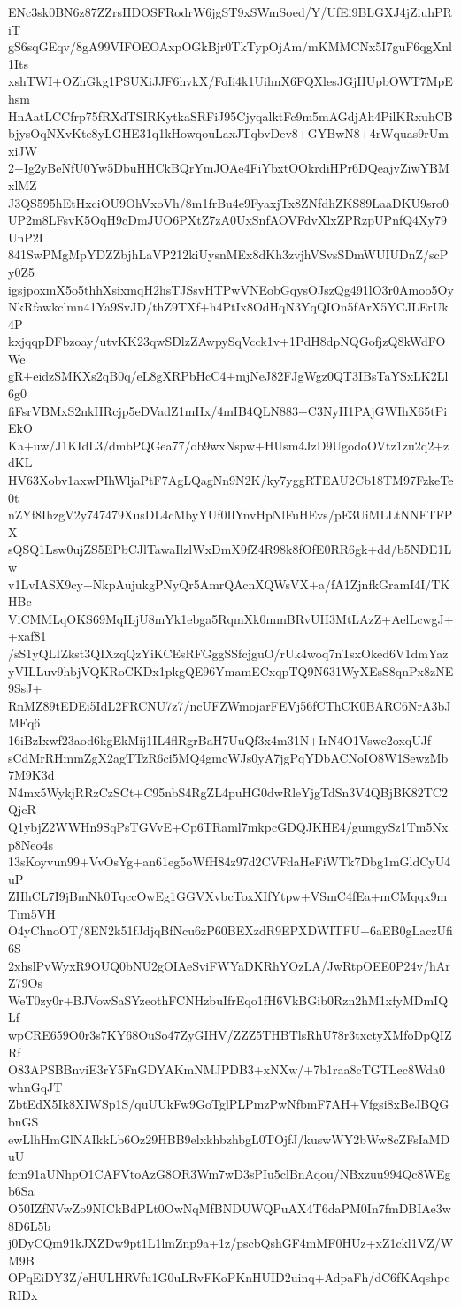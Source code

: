 ENc3sk0BN6z87ZZrsHDOSFRodrW6jgST9xSWmSoed/Y/UfEi9BLGXJ4jZiuhPRiT
gS6sqGEqv/8gA99VIFOEOAxpOGkBjr0TkTypOjAm/mKMMCNx5I7guF6qgXnl1Its
xshTWI+OZhGkg1PSUXiJJF6hvkX/FoIi4k1UihnX6FQXlesJGjHUpbOWT7MpEhsm
HnAatLCCfrp75fRXdTSIRKytkaSRFiJ95CjyqalktFc9m5mAGdjAh4PilKRxuhCB
bjysOqNXvKte8yLGHE31q1kHowqouLaxJTqbvDev8+GYBwN8+4rWquas9rUmxiJW
2+Ig2yBeNfU0Yw5DbuHHCkBQrYmJOAe4FiYbxtOOkrdiHPr6DQeajvZiwYBMxlMZ
J3QS595hEtHxciOU9OhVxoVh/8m1frBu4e9FyaxjTx8ZNfdhZKS89LaaDKU9sro0
UP2m8LFsvK5OqH9cDmJUO6PXtZ7zA0UxSnfAOVFdvXlxZPRzpUPnfQ4Xy79UnP2I
841SwPMgMpYDZZbjhLaVP212kiUysnMEx8dKh3zvjhVSvsSDmWUIUDnZ/scPy0Z5
igsjpoxmX5o5thhXsixmqH2hsTJSsvHTPwVNEobGqysOJszQg491lO3r0Amoo5Oy
NkRfawkclmn41Ya9SvJD/thZ9TXf+h4PtIx8OdHqN3YqQIOn5fArX5YCJLErUk4P
kxjqqpDFbzoay/utvKK23qwSDlzZAwpySqVcck1v+1PdH8dpNQGofjzQ8kWdFOWe
gR+eidzSMKXs2qB0q/eL8gXRPbHcC4+mjNeJ82FJgWgz0QT3IBsTaYSxLK2Ll6g0
fiFsrVBMxS2nkHRcjp5eDVadZ1mHx/4mIB4QLN883+C3NyH1PAjGWIhX65tPiEkO
Ka+uw/J1KIdL3/dmbPQGea77/ob9wxNspw+HUsm4JzD9UgodoOVtz1zu2q2+zdKL
HV63Xobv1axwPIhWljaPtF7AgLQagNn9N2K/ky7yggRTEAU2Cb18TM97FzkeTe0t
nZYf8IhzgV2y747479XusDL4cMbyYUf0IlYnvHpNlFuHEvs/pE3UiMLLtNNFTFPX
sQSQ1Lsw0ujZS5EPbCJlTawaIlzlWxDmX9fZ4R98k8fOfE0RR6gk+dd/b5NDE1Lw
v1LvIASX9cy+NkpAujukgPNyQr5AmrQAcnXQWsVX+a/fA1ZjnfkGramI4I/TKHBc
ViCMMLqOKS69MqILjU8mYk1ebga5RqmXk0mmBRvUH3MtLAzZ+AelLcwgJ++xaf81
/sS1yQLIZkst3QIXzqQzYiKCEsRFGggSSfcjguO/rUk4woq7nTsxOked6V1dmYaz
yVILLuv9hbjVQKRoCKDx1pkgQE96YmamECxqpTQ9N631WyXEsS8qnPx8zNE9SsJ+
RnMZ89tEDEi5IdL2FRCNU7z7/ncUFZWmojarFEVj56fCThCK0BARC6NrA3bJMFq6
16iBzIxwf23aod6kgEkMij1IL4flRgrBaH7UuQf3x4m31N+IrN4O1Vswc2oxqUJf
sCdMrRHmmZgX2agTTzR6ci5MQ4gmcWJs0yA7jgPqYDbACNoIO8W1SewzMb7M9K3d
N4mx5WykjRRzCzSCt+C95nbS4RgZL4puHG0dwRleYjgTdSn3V4QBjBK82TC2QjcR
Q1ybjZ2WWHn9SqPsTGVvE+Cp6TRaml7mkpcGDQJKHE4/gumgySz1Tm5Nxp8Neo4s
13sKoyvun99+VvOsYg+an61eg5oWfH84z97d2CVFdaHeFiWTk7Dbg1mGldCyU4uP
ZHhCL7I9jBmNk0TqccOwEg1GGVXvbcToxXIfYtpw+VSmC4fEa+mCMqqx9mTim5VH
O4yChnoOT/8EN2k51fJdjqBfNcu6zP60BEXzdR9EPXDWITFU+6aEB0gLaczUfi6S
2xhslPvWyxR9OUQ0bNU2gOIAeSviFWYaDKRhYOzLA/JwRtpOEE0P24v/hArZ79Os
WeT0zy0r+BJVowSaSYzeothFCNHzbuIfrEqo1fH6VkBGib0Rzn2hM1xfyMDmIQLf
wpCRE659O0r3s7KY68OuSo47ZyGIHV/ZZZ5THBTlsRhU78r3txctyXMfoDpQIZRf
O83APSBBnviE3rY5FnGDYAKmNMJPDB3+xNXw/+7b1raa8cTGTLec8Wda0whnGqJT
ZbtEdX5Ik8XIWSp1S/quUUkFw9GoTglPLPmzPwNfbmF7AH+Vfgsi8xBeJBQGbnGS
ewLlhHmGlNAIkkLb6Oz29HBB9elxkhbzhbgL0TOjfJ/kuswWY2bWw8cZFsIaMDuU
fcm91aUNhpO1CAFVtoAzG8OR3Wm7wD3sPIu5clBnAqou/NBxzuu994Qc8WEgb6Sa
O50IZfNVwZo9NICkBdPLt0OwNqMfBNDUWQPuAX4T6daPM0In7fmDBIAe3w8D6L5b
j0DyCQm91kJXZDw9pt1L1lmZnp9a+1z/pscbQshGF4mMF0HUz+xZ1ckl1VZ/WM9B
OPqEiDY3Z/eHULHRVfu1G0uLRvFKoPKnHUID2uinq+AdpaFh/dC6fKAqshpcRIDx
